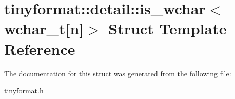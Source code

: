 \hypertarget{structtinyformat_1_1detail_1_1is__wchar_3_01wchar__t[n]_4}{}\section{tinyformat\+:\+:detail\+:\+:is\+\_\+wchar$<$ wchar\+\_\+t\mbox{[}n\mbox{]}$>$ Struct Template Reference}
\label{structtinyformat_1_1detail_1_1is__wchar_3_01wchar__t[n]_4}


The documentation for this struct was generated from the following file\+:\begin{DoxyCompactItemize}
\item 
tinyformat.\+h\end{DoxyCompactItemize}
